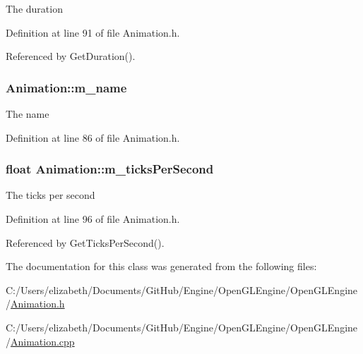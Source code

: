 The duration 



Definition at line 91 of file Animation.\+h.



Referenced by Get\+Duration().

\subsubsection[{\texorpdfstring{m\+\_\+name}{m_name}}]{ Animation\+::m\+\_\+name\hspace{0.3cm}{\ttfamily [private]}}\hypertarget{class_animation_adda9052e1e245ea1c5f1bcb02557ef32}{}\label{class_animation_adda9052e1e245ea1c5f1bcb02557ef32}


The name 



Definition at line 86 of file Animation.\+h.

\subsubsection[{\texorpdfstring{m\+\_\+ticks\+Per\+Second}{m_ticksPerSecond}}]{\setlength{\rightskip}{0pt plus 5cm}float Animation\+::m\+\_\+ticks\+Per\+Second\hspace{0.3cm}{\ttfamily [private]}}\hypertarget{class_animation_aed0aa67f96c0f3ca518e597ae683f791}{}\label{class_animation_aed0aa67f96c0f3ca518e597ae683f791}


The ticks per second 



Definition at line 96 of file Animation.\+h.



Referenced by Get\+Ticks\+Per\+Second().



The documentation for this class was generated from the following files\+:\begin{DoxyCompactItemize}
\item 
C\+:/\+Users/elizabeth/\+Documents/\+Git\+Hub/\+Engine/\+Open\+G\+L\+Engine/\+Open\+G\+L\+Engine/\hyperlink{_animation_8h}{Animation.\+h}\item 
C\+:/\+Users/elizabeth/\+Documents/\+Git\+Hub/\+Engine/\+Open\+G\+L\+Engine/\+Open\+G\+L\+Engine/\hyperlink{_animation_8cpp}{Animation.\+cpp}\end{DoxyCompactItemize}
